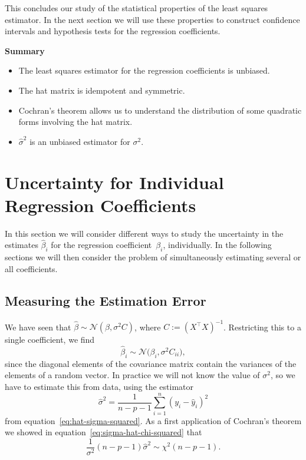 \documentclass[
  a4paper,
]{article}
\providecommand{\tightlist}{%
  \setlength{\itemsep}{0pt}\setlength{\parskip}{0pt}}
\theoremstyle{definition}
\theoremstyle{definition}
\theoremstyle{definition}
\theoremstyle{definition}
\theoremstyle{remark}
\begin{document}
This concludes our study of the statistical properties of the least squares
estimator. In the next section we will use these properties to construct
confidence intervals and hypothesis tests for the regression coefficients.

\textbf{Summary}

\begin{itemize}
\tightlist
\item
  The least squares estimator for the regression coefficients is unbiased.
\item
  The hat matrix is idempotent and symmetric.
\item
  Cochran's theorem allows us to understand the distribution of some
  quadratic forms involving the hat matrix.
\item
  \(\hat\sigma^2\) is an unbiased estimator for \(\sigma^2\).
\end{itemize}

\clearpage

\section{Uncertainty for Individual Regression Coefficients}\label{S05-single}

In this section we will consider different ways to study the uncertainty in the
estimates \(\hat\beta_i\) for the regression coefficient~\(\beta_i\),
individually. In the following sections we will then consider the problem of
simultaneously estimating several or all coefficients.

\subsection{Measuring the Estimation Error}\label{measuring-the-estimation-error}

We have seen that \(\hat\beta \sim \mathcal{N}(\beta, \sigma^2 C)\), where
\(C := (X^\top X)^{-1}\). Restricting this to a single coefficient, we find
\begin{equation*}
  \hat\beta_i
  \sim \mathcal{N}\bigl( \beta_i, \sigma^2 C_{ii} \bigr),
\end{equation*}
since the diagonal elements of the covariance matrix contain the
variances of the elements of a random vector. In practice we will not
know the value of \(\sigma^2\), so we have to estimate this from data,
using the estimator
\begin{equation*}
  \hat\sigma^2
  = \frac{1}{n-p-1} \sum_{i=1}^n (y_i - \hat y_i)^2
\end{equation*}
from equation~\eqref{eq:hat-sigma-squared}. As a first application of
Cochran's theorem we showed in equation~\eqref{eq:sigma-hat-chi-squared}
that
\begin{equation*}
  \frac{1}{\sigma^2} (n - p - 1) \hat\sigma^2
  \sim \chi^2(n - p - 1).
\end{equation*}
\end{document}
